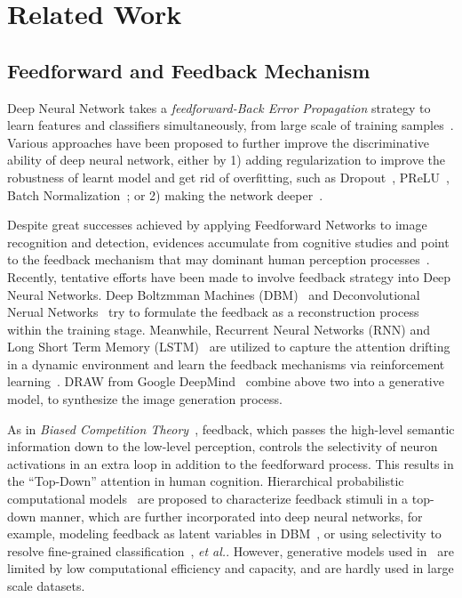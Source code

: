 \section{Related Work}
\label{sec:related_work}

\subsection{Feedforward and Feedback Mechanism}
Deep Neural Network takes a \emph{feedforward-Back Error Propagation} strategy to learn features and classifiers simultaneously, from large scale of training samples~\cite{Krizhevsky2012ImageNet,Simonyan2014Very,lin2013network,salakhutdinov2009deep,bengio2013representation}. Various approaches have been proposed to further improve the discriminative ability of deep neural network, either by 1) adding regularization to improve the robustness of learnt model and get rid of overfitting, such as Dropout~\cite{srivastava2014dropout}, PReLU~\cite{he2015delving}, Batch Normalization~\cite{ioffe2015batch}; or 2) making the network deeper~\cite{Szegedy2014Going,Simonyan2014Very}.

Despite great successes achieved by applying Feedforward Networks to image recognition and detection, evidences accumulate from cognitive studies and point to the feedback mechanism that may dominant human perception processes~\cite{Cichy2014Resolving,Rust:2010if,Kruger2013Deep,lee2003hierarchical}. Recently, tentative efforts have been made to involve feedback strategy into Deep Neural Networks. Deep Boltzmman Machines
(DBM)~\cite{salakhutdinov2009deep,sohn2013learning} and Deconvolutional Nerual Networks~\cite{Zeiler:2011hy} try to formulate the feedback as a reconstruction process within the training stage. Meanwhile, Recurrent Neural Networks (RNN) and Long Short Term Memory (LSTM)~\cite{hochreiter1997long} are utilized to capture the attention drifting in a dynamic environment and learn the feedback mechanisms via reinforcement learning~\cite{Stollenga:2014tl,Mnih:2014ti}. DRAW from Google
DeepMind~\cite{gregor2015draw} combine above two into a generative model, to synthesize the image generation process.

As in \emph{Biased Competition Theory}~\cite{beck2009top,desimone1995neural}, feedback, which passes the high-level semantic information down to the low-level perception, controls the selectivity of neuron activations in an extra loop in addition to the feedforward process. This results in the ``Top-Down'' attention in human cognition. Hierarchical probabilistic computational models~\cite{lee2003hierarchical} are proposed to characterize feedback stimuli in a top-down manner, which are further incorporated into deep neural networks, for example, modeling feedback as latent variables in DBM~\cite{wang2014attentional}, or using selectivity to resolve fine-grained classification~\cite{Mnih:2014ti}, \emph{et al.}. However, generative models used in~\cite{Mnih:2014ti,wang2014attentional} are limited by low computational efficiency and capacity, and are hardly used in large scale datasets.

